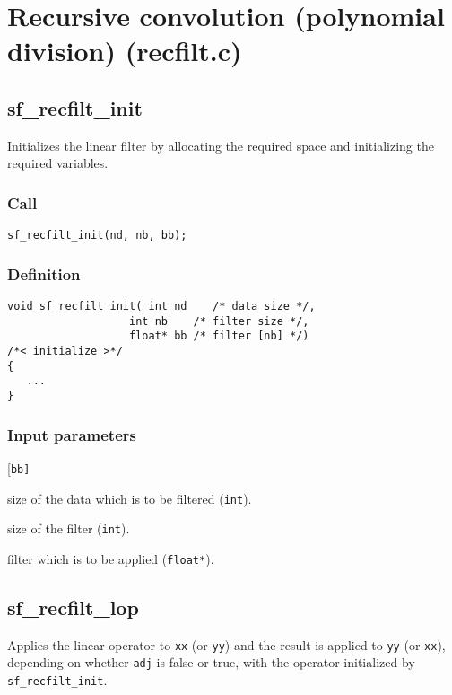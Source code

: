 \section{Recursive convolution (polynomial division) (recfilt.c)}




\subsection{{sf\_recfilt\_init}}
Initializes the linear filter by allocating the required space and initializing the required variables.


\subsubsection*{Call}
\begin{verbatim}sf_recfilt_init(nd, nb, bb);\end{verbatim}

\subsubsection*{Definition}
\begin{verbatim}
void sf_recfilt_init( int nd    /* data size */, 
                   int nb    /* filter size */, 
                   float* bb /* filter [nb] */) 
/*< initialize >*/
{
   ...
}
\end{verbatim}

\subsubsection*{Input parameters}
\begin{desclist}{\tt }{\quad}[\tt bb]
   \setlength\itemsep{0pt}
   \item[nd] size of the data which is to be filtered (\texttt{int}).  
   \item[nb] size of the filter (\texttt{int}). 
   \item[bb] filter which is to be applied (\texttt{float*}).  
\end{desclist}




\subsection{{sf\_recfilt\_lop}}
Applies the linear operator to \texttt{xx} (or \texttt{yy}) and the result is applied to \texttt{yy} (or \texttt{xx}), depending on whether \texttt{adj} is false or true, with the operator initialized by \texttt{sf\_recfilt\_init}.

